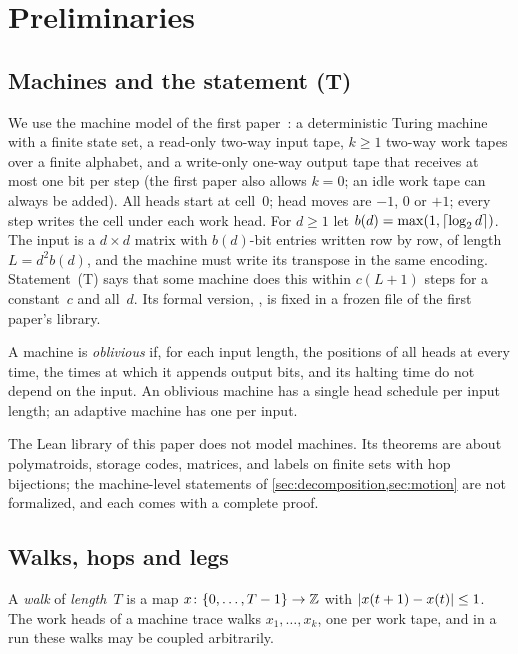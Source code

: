 \section{Preliminaries}\label{sec:prelim}

\subsection{Machines and the statement (T)}\label{sec:prelim-machines}

We use the machine model of the first paper~\cite{FirstPaper2026}: a deterministic Turing machine with a finite state
set, a read-only two-way input tape, $k\ge1$ two-way work tapes over a finite alphabet, and a write-only one-way output
tape that receives at most one bit per step (the first paper also allows $k=0$; an idle work tape can always be added). All heads start at cell~$0$; head moves are $-1$, $0$ or $+1$; every step
writes the cell under each work head. For $d\ge1$ let $b(d)=\max(1,\lceil \log_2 d \rceil)$. The input is a $d\times d$ matrix with
$b(d)$-bit entries written row by row, of length $L=d^2b(d)$, and the machine must write its transpose in the same
encoding. Statement~(T) says that some machine does this within $c(L+1)$ steps for a constant~$c$ and all~$d$. Its
formal version, , is fixed in a frozen file of the first paper's library.

A machine is \emph{oblivious} if, for each input length, the positions of all heads at every time, the times at which it
appends output bits, and its halting time do not depend on the input. An oblivious machine has a single head schedule
per input length; an adaptive machine has one per input.

The Lean library of this paper does not model machines. Its theorems are about polymatroids, storage codes, matrices, and
labels on finite sets with hop bijections; the machine-level statements of \cref{sec:decomposition,sec:motion} are not formalized, and each comes
with a complete proof.

\subsection{Walks, hops and legs}\label{sec:prelim-walks}

A \emph{walk} of \emph{length}~$T$ is a map $x\colon\{0,\dots,T-1\}\to\mathbb{Z}$ with $\lvert x(t+1)-x(t) \rvert\le1$. The work heads of a machine trace
walks $x_1,\dots,x_k$, one per work tape, and in a run these walks may be coupled arbitrarily.

